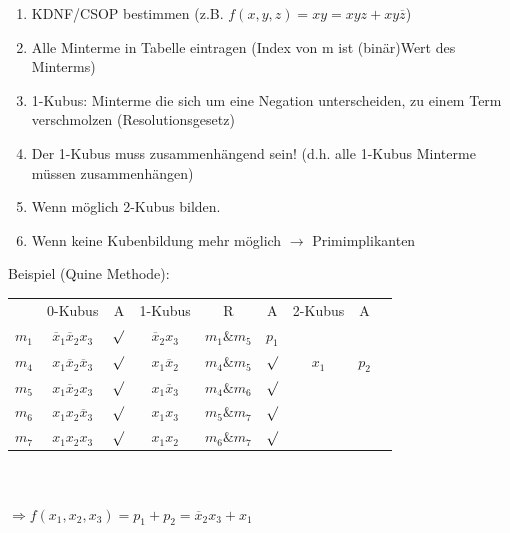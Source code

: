 \documentclass[6pt,a4paper]{scrartcl}
\newcommand{\ol}[1]{\ensuremath{\overline{#1}}}									%
\newcommand{\Ra}[0]{\ensuremath{\Rightarrow}}									%
\newcommand{\ra}[0]{\ensuremath{\rightarrow}} 									%
\begin{document}
\begin{multicols*}{3}
	\begin{enumerate}
		\item KDNF/CSOP bestimmen (z.B. $f(x,y,z) = xy = xyz + xy\overline z$)
		\item Alle Minterme in Tabelle eintragen (Index von m ist (binär)Wert des Minterms)
		\item 1-Kubus: Minterme die sich um eine Negation unterscheiden, zu einem Term verschmolzen (Resolutionsgesetz)
		\item Der 1-Kubus muss zusammenhängend sein! (d.h. alle 1-Kubus Minterme müssen zusammenhängen)
		\item Wenn möglich 2-Kubus bilden.
		\item Wenn keine Kubenbildung mehr möglich $\ra$ Primimplikanten
	\end{enumerate}
	Beispiel (Quine Methode):
	
	\begin{tabular}{l | c | c  || c | c | c || c | c | r}
	      & 0-Kubus & A & 1-Kubus & R & A & 2-Kubus  & A \\
	$m_1$ & $\overline x_1 \overline x_2 x_3$ & $\surd$ & $\overline x_2 x_3$ & $m_1 \& m_5$ & $p_1$ & &\\
	$m_4$ & $x_1 \overline x_2 \overline x_3$ & $\surd$ & $x_1 \overline x_2$ & $m_4 \& m_5$ & $\surd$ & $x_1$ &   $p_2$\\
	$m_5$ & $x_1 \overline x_2  x_3$ & $\surd$  & $x_1 \overline x_3$ & $m_4 \& m_6$ & $\surd$& &\\
	$m_6$ & $x_1 x_2 \overline x_3$ & $ \surd$ & $x_1 x_3$ & $ m_5 \& m_7$ & $ \surd$ & &\\
	$m_7$ & $x_1 x_2 x_3$ & $\surd$ & $x_1 x_2$ & $m_6 \& m_7 $ & $ \surd$ & &\\
	\end{tabular} \\ \\
	$\Ra f(x_1,x_2,x_3)=p_1+p_2=\ol x_2x_3 + x_1$
	

\end{multicols*}
\end{document}

